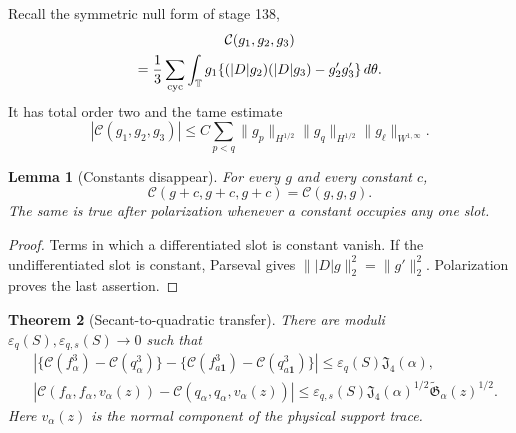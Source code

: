 \documentclass[11pt]{amsart}
\numberwithin{equation}{section}
\newtheorem{theorem}{Theorem}[section]
\newtheorem{lemma}[theorem]{Lemma}
\theoremstyle{definition}
\theoremstyle{remark}
\newcommand{\T}{\mathbb T}
\newcommand{\Dop}{|D|}
\newcommand{\Jfour}{\mathfrak J_4}
\newcommand{\Cnull}{\mathcal C}
\begin{document}
Recall the symmetric null form of stage 138,
\begin{multline}\label{QB:eq:C}
 \Cnull(g_1,g_2,g_3)\\
 =\frac13\sum_{\rm cyc}\int_\T g_1
 \{(\Dop g_2)(\Dop g_3)-g_2'g_3'\}\,d\theta.
\end{multline}
It has total order two and the tame estimate
\begin{equation}\label{QB:eq:C-tame}
 |\Cnull(g_1,g_2,g_3)|
 \le C\sum_{p<q}\|g_p\|_{H^{1/2}}\|g_q\|_{H^{1/2}}
 \|g_\ell\|_{W^{1,\infty}}.
\end{equation}

\begin{lemma}[Constants disappear]
\label{QB:lem:constant}
For every $g$ and every constant $c$,
\begin{equation}\label{QB:eq:constant}
 \Cnull(g+c,g+c,g+c)=\Cnull(g,g,g).
\end{equation}
The same is true after polarization whenever a constant occupies any one
slot.
\end{lemma}

\begin{proof}
Terms in which a differentiated slot is constant vanish.  If the
undifferentiated slot is constant, Parseval gives
$\|\Dop g\|_2^2=\|g'\|_2^2$.  Polarization proves the last assertion.
\end{proof}

\begin{theorem}[Secant-to-quadratic transfer]
\label{QB:thm:transfer}
There are moduli $\varepsilon_q(S),\varepsilon_{q,s}(S)\to0$ such that
\begin{align}
 &|\{\Cnull(f_\alpha^3)-\Cnull(q_\alpha^3)\}
 -\{\Cnull(f_{a\mathbf1}^3)-\Cnull(q_{a\mathbf1}^3)\}|
 \le\varepsilon_q(S)\Jfour(\alpha),
 \label{QB:eq:transfer-fan}\\
 &|\Cnull(f_\alpha,f_\alpha,v_\alpha(z))
 -\Cnull(q_\alpha,q_\alpha,v_\alpha(z))|
 \le\varepsilon_{q,s}(S)\Jfour(\alpha)^{1/2}
 \widetilde{\mathfrak G}_\alpha(z)^{1/2}.
 \label{QB:eq:transfer-mixed}
\end{align}
Here $v_\alpha(z)$ is the normal component of the physical support trace.
\end{theorem}
\end{document}
